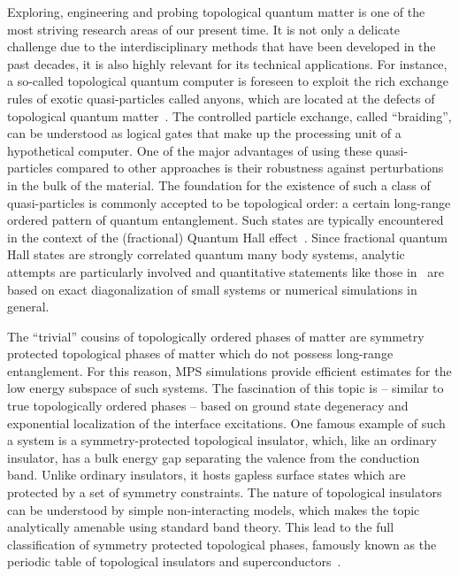Exploring, engineering and probing topological quantum matter is one of the most striving research areas of our present time.
It is not only a delicate challenge due to the interdisciplinary methods that have been developed in the past decades, it is also highly relevant for its technical applications.
For instance, a so-called topological quantum computer is foreseen to exploit the rich exchange rules of exotic quasi-particles called anyons, which are located at the defects of topological quantum matter~\cite{Freedman2002}.
The controlled particle exchange, called ``braiding'', can be understood as logical gates that make up the processing unit of a hypothetical computer.
One of the major advantages of using these quasi-particles compared to other approaches is their robustness against perturbations in the bulk of the material.
The foundation for the existence of such a class of quasi-particles is commonly accepted to be topological order: a certain long-range ordered pattern of quantum entanglement.
Such states are typically encountered in the context of the (fractional) Quantum Hall effect~\cite{Moore1991,Read1996,Levin2007,Lee2007,Storni2010,Rezayi2017}.
Since fractional quantum Hall states are strongly correlated quantum many body systems, analytic attempts are particularly involved and quantitative statements like those in~\cite{Storni2010} are based on exact diagonalization of small systems or numerical simulations in general.

The ``trivial'' cousins of topologically ordered phases of matter are symmetry protected topological phases of matter which do not possess long-range entanglement.
For this reason, MPS simulations provide efficient estimates for the low energy subspace of such systems.
The fascination of this topic is -- similar to true topologically ordered phases -- based on ground state degeneracy and exponential localization of the interface excitations.
One famous example of such a system is a symmetry-protected topological insulator, which, like an ordinary insulator, has a bulk energy gap separating the valence from the conduction band.
Unlike ordinary insulators, it hosts gapless surface states which are protected by a set of symmetry constraints.
The nature of topological insulators can be understood by simple non-interacting models, which makes the topic analytically amenable using standard band theory.
This lead to the full classification of symmetry protected topological phases, famously known as the periodic table of topological insulators and superconductors~\cite{Altland1997,Kitaev2009}.

